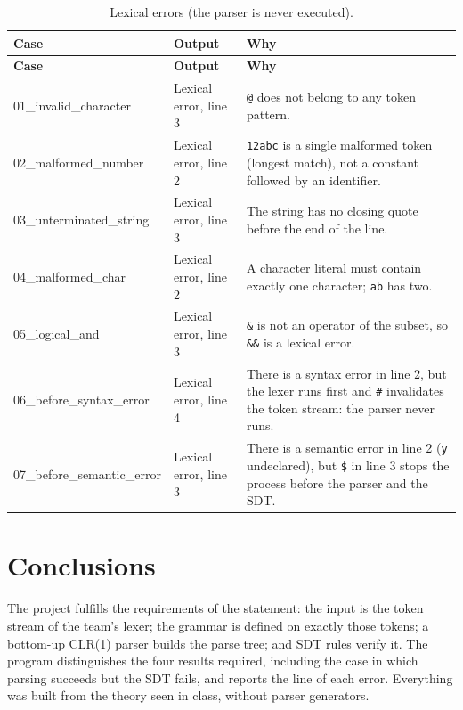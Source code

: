 \documentclass[11pt,letterpaper]{article}
\let\oldsection\section
\renewcommand{\section}{\needspace{8\baselineskip}\oldsection}
\begin{document}
{\begin{longtable}{@{}p{3.6cm}p{2.9cm}p{8.6cm}@{}}
\caption{Lexical errors (the parser is never executed).}\\
\toprule
\textbf{Case} & \textbf{Output} & \textbf{Why}\\
\midrule
\endfirsthead
\toprule
\textbf{Case} & \textbf{Output} & \textbf{Why}\\
\midrule
\endhead
01\_\allowbreak{}invalid\_\allowbreak{}character & Lexical error, line 3 & \texttt{@} does not belong to any token pattern. \\
02\_\allowbreak{}malformed\_\allowbreak{}number & Lexical error, line 2 & \texttt{12abc} is a single malformed token (longest match), not a constant followed by an identifier. \\
03\_\allowbreak{}unterminated\_\allowbreak{}string & Lexical error, line 3 & The string has no closing quote before the end of the line. \\
04\_\allowbreak{}malformed\_\allowbreak{}char & Lexical error, line 2 & A character literal must contain exactly one character; \texttt{\textquotesingle{}ab\textquotesingle{}} has two. \\
05\_\allowbreak{}logical\_\allowbreak{}and & Lexical error, line 3 & \texttt{\&} is not an operator of the subset, so \texttt{\&\&} is a lexical error. \\
06\_\allowbreak{}before\_\allowbreak{}syntax\_\allowbreak{}error & Lexical error, line 4 & There is a syntax error in line 2, but the lexer runs first and \texttt{\#} invalidates the token stream: the parser never runs. \\
07\_\allowbreak{}before\_\allowbreak{}semantic\_\allowbreak{}error & Lexical error, line 3 & There is a semantic error in line 2 (\texttt{y} undeclared), but \texttt{\$} in line 3 stops the process before the parser and the SDT. \\
\bottomrule
\end{longtable}
}

\FloatBarrier
\section{Conclusions}

The project fulfills the requirements of the statement: the input is the
token stream of the team's lexer; the grammar is defined on exactly those
tokens; a bottom-up CLR(1) parser builds the parse tree; and SDT rules verify
it. The program distinguishes the four results required, including the case
in which parsing succeeds but the SDT fails, and reports the line of each
error. Everything was built from the theory seen in class, without parser
generators.
\end{document}
